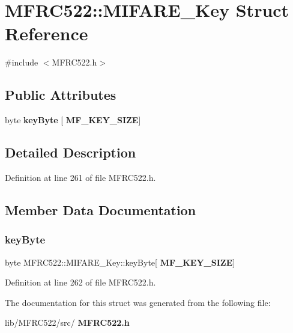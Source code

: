 \section{M\+F\+R\+C522\+:\+:M\+I\+F\+A\+R\+E\+\_\+\+Key Struct Reference}
\label{struct_m_f_r_c522_1_1_m_i_f_a_r_e___key}


{\ttfamily \#include $<$M\+F\+R\+C522.\+h$>$}

\subsection*{Public Attributes}
\begin{DoxyCompactItemize}
\item 
byte \textbf{ key\+Byte} [\textbf{ M\+F\+\_\+\+K\+E\+Y\+\_\+\+S\+I\+ZE}]
\end{DoxyCompactItemize}


\subsection{Detailed Description}


Definition at line 261 of file M\+F\+R\+C522.\+h.



\subsection{Member Data Documentation}
\mbox{\label{struct_m_f_r_c522_1_1_m_i_f_a_r_e___key_af4b154f686bfbb46e6ee780ce154cefa}} 
\subsubsection{key\+Byte}
{\footnotesize\ttfamily byte M\+F\+R\+C522\+::\+M\+I\+F\+A\+R\+E\+\_\+\+Key\+::key\+Byte[\textbf{ M\+F\+\_\+\+K\+E\+Y\+\_\+\+S\+I\+ZE}]}



Definition at line 262 of file M\+F\+R\+C522.\+h.



The documentation for this struct was generated from the following file\+:\begin{DoxyCompactItemize}
\item 
lib/\+M\+F\+R\+C522/src/\textbf{ M\+F\+R\+C522.\+h}\end{DoxyCompactItemize}
